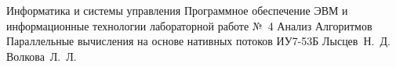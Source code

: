 \documentclass{bmstu}
\begin{document}
\makereporttitle
{Информатика и системы управления} %
{Программное обеспечение ЭВМ и информационные технологии}
{лабораторной работе №~4} %
{Анализ Алгоритмов} %
{Параллельные вычисления на основе нативных потоков} %
{} %
{ИУ7-53Б} %
{Лысцев~Н.~Д.} %
{Волкова~Л.~Л.}

\maketableofcontents








\makebibliography
\end{document}
